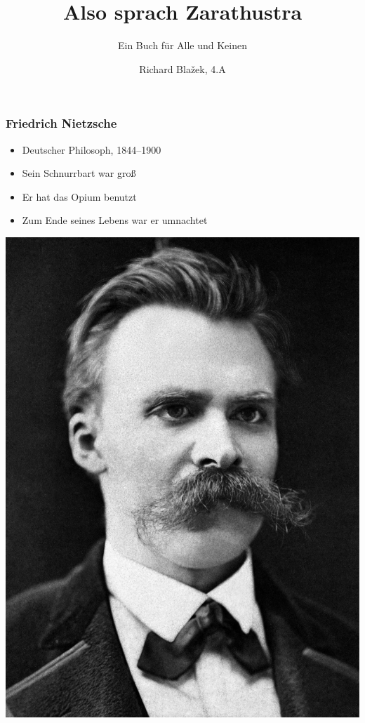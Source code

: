 \documentclass{beamer}
\title{Also sprach Zarathustra}
\subtitle{Ein Buch für Alle und Keinen}
\author{Richard Blažek, 4.A}
\date{}
\begin{document}
 \begin{frame}
\titlepage
\end{frame}

\begin{frame}
\frametitle{Friedrich Nietzsche}
\begin{minipage}{.49\textwidth}
\begin{itemize}
\item Deutscher Philosoph, 1844--1900
\item Sein Schnurrbart war gro\ss{}
\item Er hat das Opium benutzt
\item Zum Ende seines Lebens war er umnachtet
\end{itemize}
\end{minipage}
\begin{minipage}{.49\textwidth}
\includegraphics[width=\textwidth]{friedrich.jpg}
\end{minipage}
\end{frame}
\end{document}
